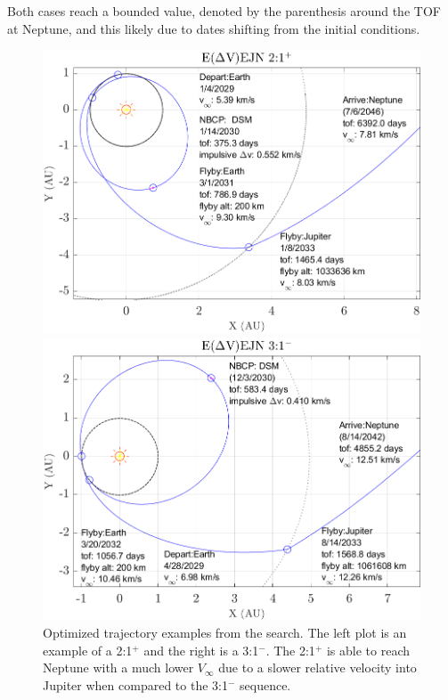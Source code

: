 \documentclass[letterpaper, paper,11pt]{./AAS}		%
\begin{document}
Both cases reach a bounded value, denoted by the parenthesis around the TOF at Neptune, and this likely due to dates shifting from the initial conditions.
%
%
\begin{figure}[ht]
		\centering
		\begin{minipage}{0.50\textwidth}
				\centering
				\includegraphics[width=1.0\textwidth]{./Figures/eejn21plus}
    \end{minipage}\hfill
		\begin{minipage}{0.50\textwidth}
				\centering
				\includegraphics[width=1.0\textwidth]{./Figures/eejn31minus}
		\end{minipage}
		\caption{Optimized trajectory examples from the search. The left plot is an example of a 2:1$^{+}$ and the right is a 3:1$^{-}$. The 2:1$^{+}$ is able to reach Neptune with a much lower $V_\infty$ due to a slower relative velocity into Jupiter when compared to the 3:1$^{-}$ sequence.}
		\label{fig:maltotriton}
\end{figure}
\end{document}
